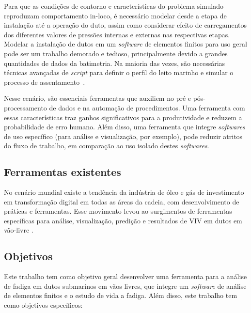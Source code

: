 Para que as condições de contorno e características do problema simulado reproduzam comportamento in-loco, é necessário modelar desde a etapa de instalação até a operação do duto, assim como considerar efeito de carregamentos dos diferentes valores de pressões internas e externas nas respectivas etapas.
Modelar a instalação de dutos em um \textit{software} de elementos finitos para uso geral pode ser um trabalho demorado e tedioso, principalmente devido a grandes quantidades de dados da batimetria.
Na maioria das vezes, são necessárias técnicas avançadas de \textit{script} para definir o perfil do leito marinho e simular o processo de assentamento~\cite{VandenAbeele2013}.

Nesse cenário, são essenciais ferramentas que auxiliem no pré e pós-processamento de dados e na automação de procedimentos.
Uma ferramenta com essas características traz ganhos significativos para a produtividade e reduzem a probabilidade de erro humano.
Além disso, uma ferramenta que integre \textit{softwares} de uso específico (para análise e visualização, por exemplo), pode reduzir atritos do fluxo de trabalho, em comparação ao uso isolado destes \textit{softwares}.


\subsection{Ferramentas existentes}


No cenário mundial existe a tendência da indústria de óleo e gás de investimento em transformação digital em todas as áreas da cadeia, com desenvolvimento de práticas e ferramentas. Esse movimento levou ao surgimentos de ferramentas específicas para análise, visualização, predição e resultados de VIV em dutos em vão-livre \cite{Mittal2017}.





\subsection{Objetivos}

Este trabalho tem como objetivo geral desenvolver uma ferramenta para a análise de fadiga em dutos submarinos em vãos livres,
que integre um \textit{software} de análise de elementos finitos e o estudo de vida a fadiga.
Além disso, este trabalho tem como objetivos específicos:

